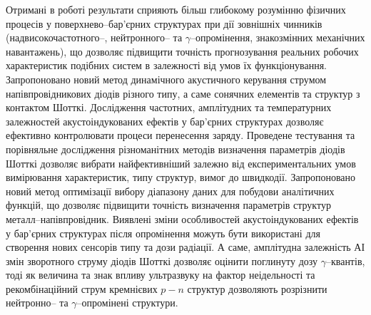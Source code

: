 {\influenceTXT}
Отримані в роботі результати сприяють більш глибокому розумінню фізичних процесів у поверхнево--бар'єрних структурах при дії зовнішніх чинників
(надвисокочастотного--, нейтронного-- та $\gamma$--опромінення, знакозмінних механічних навантажень), що
дозволяє підвищити точність прогнозування реальних робочих характеристик подібних систем в залежності від умов їх функціонування.
Запропоновано новий метод динамічного акустичного керування струмом напівпровідникових діодів різного типу, а саме сонячних елементів та структур з контактом Шотткі.
Дослідження частотних, амплітудних та температурних залежностей акустоіндукованих ефектів у бар'єрних структурах дозволяє
ефективно контролювати процеси перенесення заряду.
Проведене тестування та порівняльне дослідження різноманітних методів визначення параметрів діодів Шотткі дозволяє вибрати найфективніший залежно
від експериментальних умов вимірювання характеристик, типу структур, вимог до швидкодії.
Запропоновано новий метод оптимізації вибору діапазону даних для побудови аналітичних функцій, що дозволяє підвищити точність визначення параметрів структур металл--напівпровідник.
Виявлені зміни особливостей акустоіндукованих ефектів у бар'єрних структурах після опромінення
можуть бути використані для створення нових сенсорів типу та дози радіації.
А саме, амплітудна залежність АІ змін зворотного струму діодів Шотткі дозволяє оцінити поглинуту дозу $\gamma$--квантів, тоді
як величина та знак впливу ультразвуку на фактор неідельності та рекомбінаційний струм кремнієвих $p-n$ структур дозволяють розрізнити
нейтронно-- та $\gamma$--опромінені структури.




